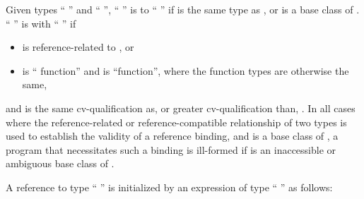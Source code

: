 \pnum
Given types `` '' and `` '',
`` '' is  to
`` '' if
 is the same type as , or
 is a base class of .
`` '' is 
with `` '' if
\begin{itemize}
\item {} is reference-related to , or
\item {} is `` function'' and  is ``function'',
where the function types are otherwise the same,
\end{itemize}
and
is the same cv-qualification as, or greater cv-qualification than,
.
In all cases where the reference-related or reference-compatible relationship
of two types is used to establish the validity of a reference binding, and
is a base class of
,
a program that necessitates such a binding is ill-formed if
is an inaccessible or ambiguous
base class of
.

\pnum
A reference to type `` '' is initialized by
an expression of type `` '' as follows:%

